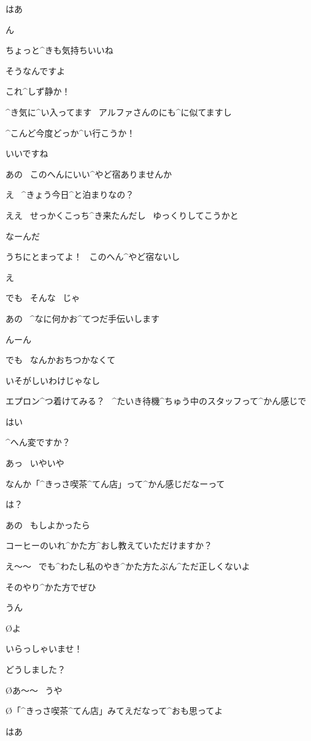 \A はあ

\page
\A ん

\A ちょっと^{きも}{気持}ちいいね

\K そうなんですよ

\A これ^{しず}{静}か！

\K ^{き}{気}に^{い}{入}ってます
\ アルファさんのにも^{に}{似}てますし

\A ^{こんど}{今度}どっか^{い}{行}こうか！

\K いいですね

\page
\K あの
\ このへんにいい^{やど}{宿}ありませんか

\A え
\ ^{きょう}{今日}^{と}{泊}まりなの？

\K ええ
\ せっかくこっち^{き}{来}たんだし
\ ゆっくりしてこうかと

\A なーんだ

\A うちにとまってよ！
\ このへん^{やど}{宿}ないし

\K え

\K でも
\ そんな
\ じゃ

\page
\K あの
\ ^{なに}{何}かお^{てつだ}{手伝}いします

\A んーん

\K でも
\ なんかおちつかなくて

\A いそがしいわけじゃなし

\A エプロン^{つ}{着}けてみる？
\ ^{たいき}{待機}^{ちゅう}{中}のスタッフって^{かん}{感}じで

\K はい

\page
\K ^{へん}{変}ですか？

\A あっ
\ いやいや

\A なんか「^{きっさ}{喫茶}^{てん}{店}」って^{かん}{感}じだなーって

\K は？

\page
\K あの
\ もしよかったら

\K コーヒーのいれ^{かた}{方}^{おし}{教}えていただけますか？

\A え〜〜
\ でも^{わたし}{私}のやき^{かた}{方}たぶん^{ただ}{正}しくないよ

\K そのやり^{かた}{方}でぜひ

\A うん

\page
\O よ

\page
\K いらっしゃいませ！

\A どうしました？

\O あ〜〜
\ うや

\O 「^{きっさ}{喫茶}^{てん}{店}」みてえだなって^{おも}{思}ってよ

\A はあ

